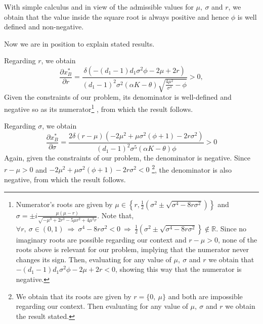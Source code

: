 With simple calculus and in view of the admissible values for $\mu, \ \sigma$ and $r$, we obtain that the value inside the square root is always positive and hence $\phi$ is well defined and non-negative.

Now we are in position to explain stated results.

Regarding $r$, we obtain
$$\frac{\partial x^*_B}{\partial r}=\frac{\delta  \left(-(d_1-1) d_1 \sigma ^2 \phi-2 \mu +2 r \right)}{(d_1-1)^2 \sigma ^2 (\alpha  K-\theta ) \sqrt{\frac{4 \mu ^2}{\sigma ^4}-\phi}}>0,$$
Given the constraints of our problem, its denominator is well-defined and negative so as its numerator\footnote{Numerator's roots are given by $\mu \in \left\{r, \frac{1}{2}\left(\sigma ^2\pm\sqrt{\sigma ^4-8 r \sigma ^2}\right) \right\}$ and $\sigma = \pm i \frac{ \mu  (\mu -r)}{\sqrt{-\mu ^3+2 r^3-5 \mu  r^2+4 \mu ^2 r}}$. Note that,\\
$\forall r, \ \sigma \in (0,1) \ \Rightarrow \ \sigma ^4-8 r \sigma ^2<0 \ \Rightarrow \ \frac{1}{2}\left(\sigma ^2\pm\sqrt{\sigma ^4-8 r \sigma ^2}\right \} \notin \mathds{R}.$ 
Since no imaginary roots are possible regarding our context and $r-\mu>0$, none of the roots above is relevant for our problem, implying that the numerator never changes its sign. Then, evaluating for any value of $\mu, \ \sigma$ and $r$ we obtain that $-(d_1-1) d_1 \sigma ^2 \phi-2 \mu +2 r <0$, showing this way that the numerator is negative. }
, from which the result follows.


Regarding $\sigma$, we obtain
\begin{equation}
\frac{\partial x^*_B}{\partial \sigma}=\frac{2 \delta  (r-\mu) \left(-2 \mu ^2+\mu  \sigma ^2 \left(\phi+1\right)-2 r \sigma ^2\right)}{(d_1-1)^2 \sigma ^5 (\alpha  K-\theta ) \phi}>0
\label{1_xBs}
\end{equation}
Again, given the constraints of our problem, the denominator is negative.
Since $r-\mu>0$ and $-2 \mu ^2+\mu  \sigma ^2 \left(\phi+1\right)-2 r \sigma ^2<0$
\footnote{We obtain that its roots are given by $r=\{0, \ \mu \}$ and both are impossible regarding our context. Then evaluating for any value of $\mu, \ \sigma$ and $r$ we obtain the result stated.}, the denominator is also negative, from which the result follows.

